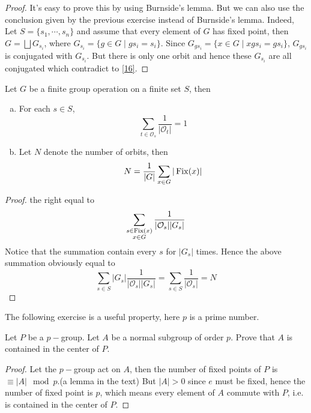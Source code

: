 \begin{proof}
  It's easy to prove this by using Burnside's lemma. But we can also use the conclusion given by the previous exercise instead of Burnside's lemma. Indeed, Let $S=\{s_1,\cdots,s_n\}$ and assume that every element of $G$ has fixed point, then $G=\bigsqcup G_{s_i}$, where $G_{s_i}=\{g\in G\mid gs_i=s_i\}$. Since $G_{gs_i}=\{x\in G\mid xgs_i=gs_i\}$, $G_{gs_i}$ is conjugated with $G_{s_i}$. But there is only one orbit and hence these $G_{s_i}$ are all conjugated which contradict to \ref{16}.
\end{proof}
\begin{ex}
  Let $G$ be a finite group operation on a finite set $S$, then
  \begin{enumerate}[a)]
    \setlength{\itemindent}{2ex}
    \item For each $s\in S$,
    \begin{equation*}
      \sum_{t\in\mathcal{O}_s}\frac{1}{|\mathcal{O}_t|}=1
    \end{equation*}
    \item Let $N$ denote the number of orbits, then
    \begin{equation*}
      N=\frac{1}{|G|}\sum_{x\in G}|\operatorname{Fix}(x)|
    \end{equation*}
  \end{enumerate}
\end{ex}
\begin{proof}
  the right equal to
  \begin{equation*}
    \sum_{\substack{s\in\operatorname{Fix}(x)\\x\in G}}\frac{1}{|\mathcal{O}_s||G_s|}
  \end{equation*}
  Notice that the summation contain every $s$ for $|G_s|$ times. Hence the above summation obviously equal to
  \begin{equation*}
    \sum_{s\in S}|G_s|\frac{1}{|\mathcal{O}_s||G_s|}=\sum_{s\in S}\frac{1}{|\mathcal{O}_s|}=N
  \end{equation*}
\end{proof}

The following exercise is a useful property, here $p$ is a prime number.
\begin{ex}
  Let $P$ be a $p-$group. Let $A$ be a normal subgroup of order $p$. Prove that $A$ is contained in the center of $P$.
\end{ex}
\begin{proof}
  Let the $p-$group act on $A$, then the number of fixed points of $P$ is $\equiv|A|\mod p$.(a lemma in the text) But $|A|>0$ since $e$ must be fixed, hence the number of fixed point is $p$, which means every element of $A$ commute with $P$, i.e. is contained in the center of $P$.
\end{proof}
